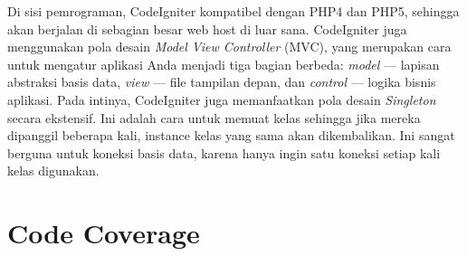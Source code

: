 Di sisi pemrograman, CodeIgniter kompatibel dengan PHP4 dan PHP5, sehingga akan berjalan di sebagian besar web host di luar sana. CodeIgniter juga menggunakan pola desain \textit{Model View Controller} (MVC), yang merupakan cara untuk mengatur aplikasi Anda menjadi tiga bagian berbeda: \textit{model} — lapisan abstraksi basis data, \textit{view} — file tampilan depan, dan \textit{control} — logika bisnis aplikasi. Pada intinya, CodeIgniter juga memanfaatkan pola desain \textit{Singleton} secara ekstensif. Ini adalah cara untuk memuat kelas sehingga jika mereka dipanggil beberapa kali, instance kelas yang sama akan dikembalikan. Ini sangat berguna untuk koneksi basis data, karena hanya ingin satu koneksi setiap kali kelas digunakan.


\section{Code Coverage}
\label{codecoverage}



